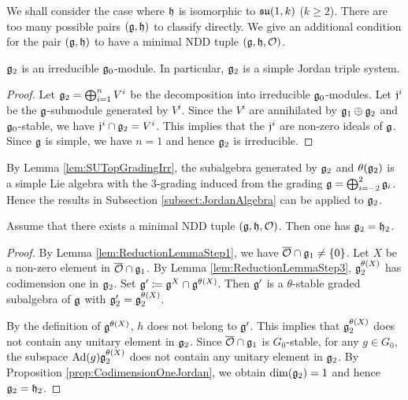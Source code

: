 We shall consider the case where $\mathfrak{h}$ is isomorphic to $\mathfrak{su}(1, k)$ ($k \geq 2$).
There are too many possible pairs $(\mathfrak{g},\mathfrak{h})$ to classify directly.
We give an additional condition for the pair $(\mathfrak{g}, \mathfrak{h})$ to have a minimal NDD tuple $(\mathfrak{g}, \mathfrak{h}, \mathcal{O})$.

\begin{lemma} \label{lem:SUTopGradingIrr}
	$\mathfrak{g}_2$ is an irreducible $\mathfrak{g}_0$-module.
	In particular, $\mathfrak{g}_2$ is a simple Jordan triple system.
\end{lemma}

\begin{proof}
	Let $\mathfrak{g}_2 = \bigoplus_{i=1}^n V^i$ be the decomposition into irreducible $\mathfrak{g}_0$-modules.
	Let $\mathfrak{j}^i$ be the $\mathfrak{g}$-submodule generated by $V^i$.
	Since the $V^i$ are annihilated by $\mathfrak{g}_1\oplus \mathfrak{g}_2$ and $\mathfrak{g}_0$-stable, we have $\mathfrak{j}^i \cap \mathfrak{g}_2 = V^i$.
	This implies that the $\mathfrak{j}^i$ are non-zero ideals of $\mathfrak{g}$.
	Since $\mathfrak{g}$ is simple, we have $n=1$ and hence $\mathfrak{g}_2$ is irreducible.
\end{proof}

By Lemma \ref{lem:SUTopGradingIrr}, the subalgebra generated by $\mathfrak{g}_2$ and $\theta(\mathfrak{g}_2)$ is a simple Lie algebra with the $3$-grading induced from the grading $\mathfrak{g} = \bigoplus_{i=-2}^2 \mathfrak{g}_i$.
Hence the results in Subsection \ref{subsect:JordanAlgebra} can be applied to $\mathfrak{g}_2$.

\begin{lemma} \label{lem:SUTopGrading}
	Assume that there exists a minimal NDD tuple $(\mathfrak{g}, \mathfrak{h}, \mathcal{O})$.
	Then one has $\mathfrak{g}_2 = \mathfrak{h}_2$.
\end{lemma}

\begin{proof}
	By Lemma \ref{lem:ReductionLemmaStep1}, we have $\overline{\mathcal{O}} \cap \mathfrak{g}_1 \neq \left\{0 \right\}$.
	Let $X$ be a non-zero element in $\overline{\mathcal{O}} \cap \mathfrak{g}_1$.
	By Lemma \ref{lem:ReductionLemmaStep3}, $\mathfrak{g}_2^{\theta(X)}$ has codimension one in $\mathfrak{g}_2$.
	Set $\mathfrak{g}' \coloneq \mathfrak{g}^X \cap \mathfrak{g}^{\theta(X)}$.
	Then $\mathfrak{g}'$ is a $\theta$-stable graded subalgebra of $\mathfrak{g}$ with $\mathfrak{g}'_2 = \mathfrak{g}_2^{\theta(X)}$.
	
	By the definition of $\mathfrak{g}^{\theta(X)}$, $h$ does not belong to $\mathfrak{g'}$.
	This implies that $\mathfrak{g}_2^{\theta(X)}$ does not contain any unitary element in $\mathfrak{g}_2$.
	Since $\overline{\mathcal{O}} \cap \mathfrak{g}_1$ is $G_0$-stable, for any $g \in G_0$, the subspace $\mathrm{Ad}(g)\mathfrak{g}_2^{\theta(X)}$ does not contain any unitary element in $\mathfrak{g}_2$.
	By Proposition \ref{prop:CodimensionOneJordan}, we obtain $\dim(\mathfrak{g}_2) = 1$ and hence $\mathfrak{g}_2 = \mathfrak{h}_2$.
\end{proof}

